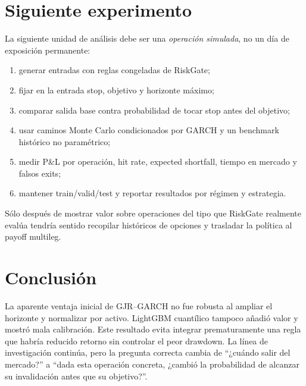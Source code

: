 \documentclass[11pt]{article}
\begin{document}
\section{Siguiente experimento}
La siguiente unidad de análisis debe ser una \emph{operación simulada}, no un día de exposición permanente:
\begin{enumerate}
  \item generar entradas con reglas congeladas de RiskGate;
  \item fijar en la entrada stop, objetivo y horizonte máximo;
  \item comparar salida base contra probabilidad de tocar stop antes del objetivo;
  \item usar caminos Monte Carlo condicionados por GARCH y un benchmark histórico no paramétrico;
  \item medir P\&L por operación, hit rate, expected shortfall, tiempo en mercado y falsos exits;
  \item mantener train/valid/test y reportar resultados por régimen y estrategia.
\end{enumerate}
Sólo después de mostrar valor sobre operaciones del tipo que RiskGate realmente evalúa tendría sentido recopilar
históricos de opciones y trasladar la política al payoff multileg.

\section{Conclusión}
La aparente ventaja inicial de GJR--GARCH no fue robusta al ampliar el horizonte y normalizar por activo.
LightGBM cuantílico tampoco añadió valor y mostró mala calibración. Este resultado evita integrar prematuramente
una regla que habría reducido retorno sin controlar el peor drawdown. La línea de investigación continúa, pero
la pregunta correcta cambia de ``¿cuándo salir del mercado?'' a ``dada esta operación concreta, ¿cambió la
probabilidad de alcanzar su invalidación antes que su objetivo?''.
\end{document}
